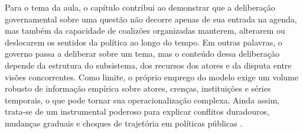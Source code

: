 \documentclass[12pt,a4paper]{article}
\begin{document}
Para o tema da aula, o capítulo contribui ao demonstrar que a deliberação governamental sobre uma questão não decorre apenas de sua entrada na agenda, mas também da capacidade de coalizões organizadas manterem, alterarem ou deslocarem os sentidos da política ao longo do tempo. Em outras palavras, o governo passa a deliberar sobre um tema, mas o conteúdo dessa deliberação depende da estrutura do subsistema, dos recursos dos atores e da disputa entre visões concorrentes.
Como limite, o próprio emprego do modelo exige um volume robusto de informação empírica sobre atores, crenças, instituições e séries temporais, o que pode tornar sua operacionalização complexa. Ainda assim, trata-se de um instrumental poderoso para explicar conflitos duradouros, mudanças graduais e choques de trajetória em políticas públicas \autocites{araujoSilva2022coalizoes}{sabatier1999theories}.
\end{document}
